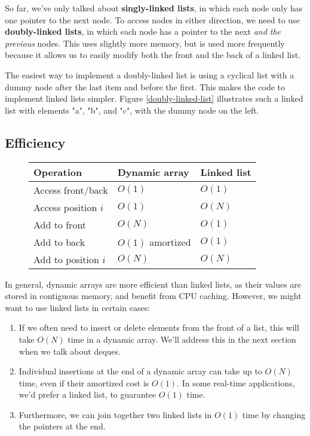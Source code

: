 So far, we've only talked about \textbf{singly-linked lists}, in which each node only has one pointer to the next node. To access nodes in either direction, we need to use \textbf{doubly-linked lists}, in which each node has a pointer to the next \textit{and the previous} nodes. This uses slightly more memory, but is used more frequently because it allows us to easily modify both the front and the back of a linked list.

The easiest way to implement a doubly-linked list is using a cyclical list with a dummy node after the last item and before the first. This makes the code to implement linked lists simpler. Figure \ref{doubly-linked-list} illustrates such a linked list with elements "a", "b", and "c", with the dummy node on the left.


\subsection{Efficiency}

\begin{figure}[h]
\begin{tabular}{| l | l | l |} \hline
    \textbf{Operation}           & \textbf{Dynamic array}    & \textbf{Linked list}  \\ \hline
    Access front/back   & $O(1)$           & $O(1)$       \\ \hline
    Access position $i$ & $O(1)$           & $O(N)$       \\ \hline
    Add to front        & $O(N)$           & $O(1)$       \\ \hline
    Add to back         & $O(1)$ amortized & $O(1)$       \\ \hline
    Add to position $i$ & $O(N)$           & $O(N)$       \\ \hline
\end{tabular}
\end{figure}

In general, dynamic arrays are more efficient than linked lists, as their values are stored in contiguous memory, and benefit from CPU caching. However, we might want to use linked lists in certain cases:

\begin{enumerate}
    \item If we often need to insert or delete elements from the front of a list, this will take $O(N)$ time in a dynamic array. We'll address this in the next section when we talk about deques.
    \item Individual insertions at the end of a dynamic array can take up to $O(N)$ time, even if their amortized cost is $O(1)$. In some real-time applications, we'd prefer a linked list, to guarantee $O(1)$ time.
    \item Furthermore, we can join together two linked lists in $O(1)$ time by changing the pointers at the end.
\end{enumerate}


